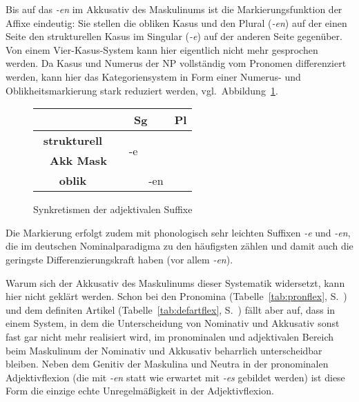 Bis auf das \textit{-en} im Akkusativ des Maskulinums ist die Markierungsfunktion der Affixe eindeutig:
Sie stellen die obliken Kasus und den Plural (\textit{-en}) auf der einen Seite den strukturellen Kasus im Singular (\textit{-e}) auf der anderen Seite gegenüber.
Von einem Vier-Kasus-System kann hier eigentlich nicht mehr gesprochen werden.
Da Kasus und Numerus der NP vollständig vom Pronomen differenziert werden, kann hier das Kategoriensystem in Form einer Numerus- und Oblikheitsmarkierung stark reduziert werden, vgl.\ Abbildung~\ref{fig:schwacheadj-r}.


\begin{figure}[!h]
  \centering
  \begin{tabular}{|ll|llll|}
    \cline{3-6}
    \multicolumn{2}{c|}{}& \multicolumn{3}{c|}{\textbf{Sg}} & \textbf{Pl} \\
    \hline
    \multicolumn{2}{|c|}{\textbf{strukturell}} && \multirow{2}{*}{-e} & \multicolumn{1}{c|}{} & \\ \cline{2-3}
    & \multicolumn{1}{|c|}{\textbf{Akk Mask}} & \multicolumn{1}{c|}{} && \multicolumn{1}{c|}{} & \\ \cline{1-1}\cline{4-5}
    \multicolumn{2}{|c|}{\multirow{2}{*}{\textbf{oblik}}} &&& \multirow{2}{*}{-en} & \\
    \multicolumn{2}{|c|}{} &&&& \\
    \hline
  \end{tabular}
  \caption{Synkretismen der adjektivalen Suffixe}
  \label{fig:schwacheadj-r}
\end{figure}

Die Markierung erfolgt zudem mit phonologisch sehr leichten Suffixen \textit{-e} und \textit{-en}, die im deutschen Nominalparadigma zu den häufigsten zählen und damit auch die geringste Differenzierungskraft haben (vor allem \textit{-en}).

Warum sich der Akkusativ des Maskulinums dieser Systematik widersetzt, kann hier nicht geklärt werden.
Schon bei den Pronomina (Tabelle~\ref{tab:pronflex}, S.~\pageref{tab:pronflex}) und dem definiten Artikel (Tabelle~\ref{tab:defartflex}, S.~\pageref{tab:defartflex}) fällt aber auf, dass in einem System, in dem die Unterscheidung von Nominativ und Akkusativ sonst fast gar nicht mehr realisiert wird, im pronominalen und adjektivalen Bereich beim Maskulinum der Nominativ und Akkusativ beharrlich unterscheidbar bleiben.
Neben dem Genitiv der Maskulina und Neutra in der pronominalen Adjektivflexion (die mit \textit{-en} statt wie erwartet mit \textit{-es} gebildet werden) ist diese Form die einzige echte Unregelmäßigkeit in der Adjektivflexion.

